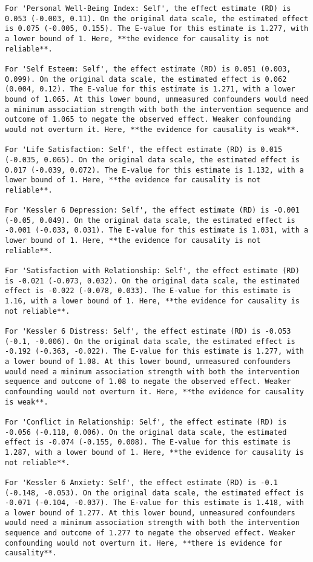 \documentclass[
  singlecolumn]{article}
\begin{document}
\begin{verbatim}
For 'Personal Well-Being Index: Self', the effect estimate (RD) is 0.053 (-0.003, 0.11). On the original data scale, the estimated effect is 0.075 (-0.005, 0.155). The E-value for this estimate is 1.277, with a lower bound of 1. Here, **the evidence for causality is not reliable**.

For 'Self Esteem: Self', the effect estimate (RD) is 0.051 (0.003, 0.099). On the original data scale, the estimated effect is 0.062 (0.004, 0.12). The E-value for this estimate is 1.271, with a lower bound of 1.065. At this lower bound, unmeasured confounders would need a minimum association strength with both the intervention sequence and outcome of 1.065 to negate the observed effect. Weaker confounding would not overturn it. Here, **the evidence for causality is weak**.

For 'Life Satisfaction: Self', the effect estimate (RD) is 0.015 (-0.035, 0.065). On the original data scale, the estimated effect is 0.017 (-0.039, 0.072). The E-value for this estimate is 1.132, with a lower bound of 1. Here, **the evidence for causality is not reliable**.

For 'Kessler 6 Depression: Self', the effect estimate (RD) is -0.001 (-0.05, 0.049). On the original data scale, the estimated effect is -0.001 (-0.033, 0.031). The E-value for this estimate is 1.031, with a lower bound of 1. Here, **the evidence for causality is not reliable**.

For 'Satisfaction with Relationship: Self', the effect estimate (RD) is -0.021 (-0.073, 0.032). On the original data scale, the estimated effect is -0.022 (-0.078, 0.033). The E-value for this estimate is 1.16, with a lower bound of 1. Here, **the evidence for causality is not reliable**.

For 'Kessler 6 Distress: Self', the effect estimate (RD) is -0.053 (-0.1, -0.006). On the original data scale, the estimated effect is -0.192 (-0.363, -0.022). The E-value for this estimate is 1.277, with a lower bound of 1.08. At this lower bound, unmeasured confounders would need a minimum association strength with both the intervention sequence and outcome of 1.08 to negate the observed effect. Weaker confounding would not overturn it. Here, **the evidence for causality is weak**.

For 'Conflict in Relationship: Self', the effect estimate (RD) is -0.056 (-0.118, 0.006). On the original data scale, the estimated effect is -0.074 (-0.155, 0.008). The E-value for this estimate is 1.287, with a lower bound of 1. Here, **the evidence for causality is not reliable**.

For 'Kessler 6 Anxiety: Self', the effect estimate (RD) is -0.1 (-0.148, -0.053). On the original data scale, the estimated effect is -0.071 (-0.104, -0.037). The E-value for this estimate is 1.418, with a lower bound of 1.277. At this lower bound, unmeasured confounders would need a minimum association strength with both the intervention sequence and outcome of 1.277 to negate the observed effect. Weaker confounding would not overturn it. Here, **there is evidence for causality**.
\end{verbatim}
\end{document}

